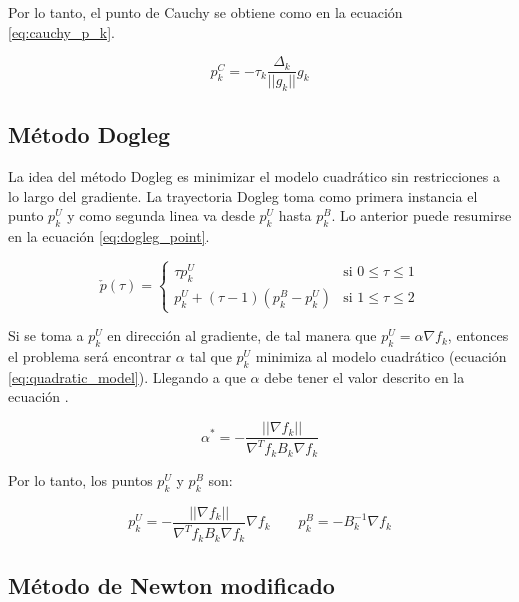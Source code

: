 Por lo tanto, el punto de Cauchy se obtiene como en la ecuación \ref{eq:cauchy_p_k}.

\begin{equation}
    p_k^C = -\tau_k \frac{\Delta_k}{||g_k||} g_k \label{eq:cauchy_p_k}
\end{equation}

\subsection{Método Dogleg \label{sec:dogleg}}

La idea del método Dogleg es minimizar el modelo cuadrático sin restricciones a lo largo del gradiente. La trayectoria Dogleg toma como primera instancia el punto $p_k^U$ y como segunda linea va desde $p_k^U$ hasta $p_k^B$. Lo anterior puede resumirse en la ecuación \ref{eq:dogleg_point}.

\begin{equation}
    \check{p}(\tau) = \left\{ \begin{matrix}
        \tau p_k^U                   & \text{si } 0 \leq \tau \leq 1 \\
        p_k^U+ (\tau-1)(p_k^B-p_k^U) & \text{si } 1 \leq \tau \leq 2
    \end{matrix} \right. \label{eq:dogleg_point}
\end{equation}

Si se toma a $p_k^U$ en dirección al gradiente, de tal manera que $p_k^U = \alpha \nabla f_k $, entonces el problema será encontrar $\alpha$ tal que $p_k^U$ minimiza al modelo cuadrático (ecuación \ref*{eq:quadratic_model}). Llegando a que $\alpha$ debe tener el valor descrito en la ecuación .

\begin{equation}
    \alpha^* = -\frac{||\nabla f_k||}{\nabla^T f_k B_k \nabla f_k}
\end{equation}

Por lo tanto, los puntos $p_k^U$ y $p_k^B$ son:

\begin{equation*}
    p_k^U = -\frac{||\nabla f_k||}{\nabla^T f_k B_k \nabla f_k} \nabla f_k \qquad p_k^B = -B_k^{-1}\nabla f_k
\end{equation*}

\subsection{Método de Newton modificado}